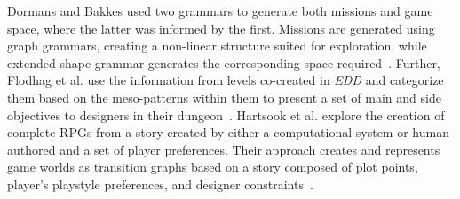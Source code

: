 

Dormans and Bakkes used two grammars to generate both missions and game space, where the latter was informed by the first. Missions are generated using graph grammars, creating a non-linear structure suited for exploration, while extended shape grammar generates the corresponding space required~. Further, Flodhag et al. use the information from levels co-created in \emph{EDD} and categorize them based on the meso-patterns within them to present a set of main and side objectives to designers in their dungeon~. Hartsook et al. explore the creation of complete RPGs from a story created by either a computational system or human-authored and a set of player preferences. Their approach creates and represents game worlds as transition graphs based on a story composed of plot points, player's playstyle preferences, and designer constraints~. 








